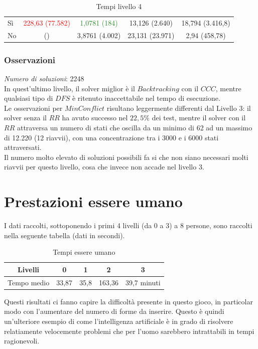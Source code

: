  \begin{table}[h] 
	\begin{tabular}{|l||*{4}{c|}}\hline 
		\backslashbox{Miglioria}{Solver} 
		&\makebox{DFS}&\makebox{Backtracking}&\makebox{Recursive Backtracking}	&\makebox{MinConflict}\\ \hline 
		Sì&\textcolor{red}{228,63 (77.582)}&\textcolor{ForestGreen}{1,0781 (184)}&13,126 (2.640)&18,794 (3.416,8) \\ \hline 
		No& ()&3,8761 (4.002)&23,131 (23.971)&2,94 (458,78)  \\ \hline 
	\end{tabular} 
	\caption{Tempi livello 4}
\end{table}

\subsubsection{Osservazioni}

\textit{Numero di soluzioni}: 2248\\

In quest'ultimo livello, il solver miglior è il $Backtracking$ con il $CCC$, mentre qualsiasi tipo di $DFS$ è ritenuto inaccettabile nel tempo di esecuzione.\\

Le osservazioni per $MinConflict$ risultano leggermente differenti dal Livello 3: il solver senza il $RR$ ha avuto successo nel $22,5\%$ dei test, mentre il solver con il $RR$ attraversa un numero di stati che oscilla da un minimo di 62 ad un massimo di 12.220 (12 riavvii), con una concentrazione tra i 3000 e i 6000 stati attraversati.\\
Il numero molto elevato di soluzioni possibili fa si che non siano necessari molti riavvii per questo livello, cosa che invece non accade nel livello 3.

\section{Prestazioni essere umano}
\label{human}
I dati raccolti, sottoponendo i primi 4 livelli (da 0 a 3) a 8 persone, sono raccolti nella seguente tabella (dati in secondi).


\begin{table}[h]
	\centering
	\begin{tabular}{lllll}
		\hline
		\multicolumn{1}{|c|}{Livelli}     & \multicolumn{1}{c|}{0}     & \multicolumn{1}{c|}{1}    & \multicolumn{1}{c|}{2}      & \multicolumn{1}{c|}{3}           \\ \hline
		\multicolumn{1}{|c|}{Tempo medio} & \multicolumn{1}{c|}{33,87} & \multicolumn{1}{c|}{35,8} & \multicolumn{1}{c|}{163,36} & \multicolumn{1}{c|}{39,7 minuti} \\ \hline                               
	\end{tabular}
	\caption{Tempi essere umano}
\end{table}
Questi risultati ci fanno capire la difficoltà presente in questo gioco, in particolar modo con l'aumentare del numero di forme da inserire. Questo è quindi un'ulteriore esempio di come l'intelligenza artificiale è in grado di risolvere relatiamente velocemente problemi che per l'uomo sarebbero intrattabili in tempi ragionevoli. 
